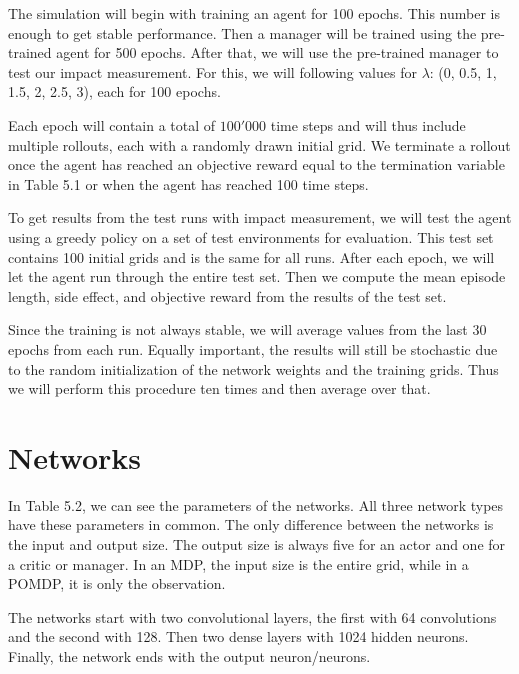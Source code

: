 \documentclass[12pt,A4]{report}
\theoremstyle{definition}
\begin{document}
The simulation will begin with training an agent for 100 epochs. This number is enough to get stable performance. Then a manager will be trained using the pre-trained agent for 500 epochs. After that, we will use the pre-trained manager to test our impact measurement. For this, we will following values for $\lambda$: (0, 0.5, 1, 1.5, 2, 2.5, 3), each for 100 epochs. 

Each epoch will contain a total of $100'000$ time steps and will thus include multiple rollouts, each with a randomly drawn initial grid. We terminate a rollout once the agent has reached an objective reward equal to the termination variable in Table 5.1 or when the agent has reached 100 time steps.

To get results from the test runs with impact measurement, we will test the agent using a greedy policy on a set of test environments for evaluation. This test set contains 100 initial grids and is the same for all runs. After each epoch, we will let the agent run through the entire test set. Then we compute the mean episode length, side effect, and objective reward from the results of the test set. 

Since the training is not always stable, we will average values from the last 30 epochs from each run. Equally important, the results will still be stochastic due to the random initialization of the network weights and the training grids. Thus we will perform this procedure ten times and then average over that. 

\section{Networks}
In Table 5.2, we can see the parameters of the networks. All three network types have these parameters in common. The only difference between the networks is the input and output size. The output size is always five for an actor and one for a critic or manager. In an MDP, the input size is the entire grid, while in a POMDP, it is only the observation. 

The networks start with two convolutional layers, the first with 64 convolutions and the second with 128. Then two dense layers with 1024 hidden neurons. Finally, the network ends with the output neuron/neurons.
\end{document}
